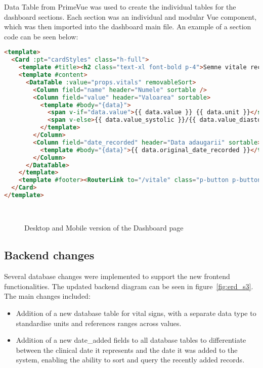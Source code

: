 Data Table from PrimeVue was used to create the individual tables for the dashboard sections. Each section was an individual and modular Vue component, which was then imported into the dashboard main file. An example of a section code can be seen below:

\begin{lstlisting}[language=HTML, caption=Vital Signs Dashboard Section Component]
<template>
  <Card :pt="cardStyles" class="h-full">
    <template #title><h2 class="text-xl font-bold p-4">Semne vitale recent adaugate</h2></template>
    <template #content>
      <DataTable :value="props.vitals" removableSort>
        <Column field="name" header="Numele" sortable />
        <Column field="value" header="Valoarea" sortable>
          <template #body="{data}">
            <span v-if="data.value">{{ data.value }} {{ data.unit }}</span>
            <span v-else>{{ data.value_systolic }}/{{ data.value_diastolic }} {{ data.unit }}</span>
          </template>
        </Column>
        <Column field="date_recorded" header="Data adaugarii" sortable>
          <template #body="{data}">{{ data.original_date_recorded }}</template>
        </Column>
      </DataTable>
    </template>
    <template #footer><RouterLink to="/vitale" class="p-button p-button-text">Vezi toate semnele vitale</RouterLink></template>
  </Card>
</template>
\end{lstlisting}

\begin{figure}[ht]
  \centering
  \\[\baselineskip]
  \caption{Desktop and Mobile version of the Dashboard page}\label{fig:dashboardpage}
\end{figure}

\FloatBarrier{}

\subsection{Backend changes}

Several database changes were implemented to support the new frontend functionalities. The updated backend diagram can be seen in figure~\ref{fig:erd_s3}. The main changes included:

\begin{itemize}
  \item Addition of a new database table for vital signs, with a separate data type to standardise units and references ranges across values.
  \item Addition of a new date\_added fields to all database tables to differentiate between the clinical date it represents and the date it was added to the system, enabling the ability to sort and query the recently added records.
\end{itemize}

